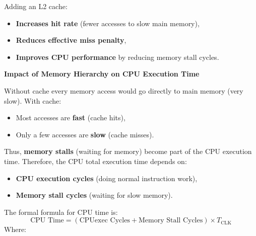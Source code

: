 \noindent
Adding an L2 cache:
\begin{itemize}[label=\textcolor{Green3}{}]
    \item \textbf{Increases hit rate} (fewer accesses to slow main memory),
    \item \textbf{Reduces effective miss penalty},
    \item \textbf{Improves CPU performance} by reducing memory stall cycles.
\end{itemize}

\newpage

\begin{flushleft}
    \textcolor{Green3}{ \textbf{Impact of Memory Hierarchy on CPU Execution Time}}
\end{flushleft}
Without cache every memory access would go directly to main memory (very slow). With cache:
\begin{itemize}
    \item Most accesses are \textbf{fast} (cache hits),
    \item Only a few accesses are \textbf{slow} (cache misses).
\end{itemize}
Thus, \textbf{memory stalls} (waiting for memory) become part of the CPU execution time. Therefore, the CPU total execution time depends on:
\begin{itemize}
    \item \textbf{CPU execution cycles} (doing normal instruction work),
    \item \textbf{Memory stall cycles} (waiting for slow memory).
\end{itemize}
The formal formula for CPU time is:
\begin{equation*}
    \text{CPU Time} = (\text{CPUexec Cycles} + \text{Memory Stall Cycles}) \times T_{\text{CLK}}
\end{equation*}
Where:
